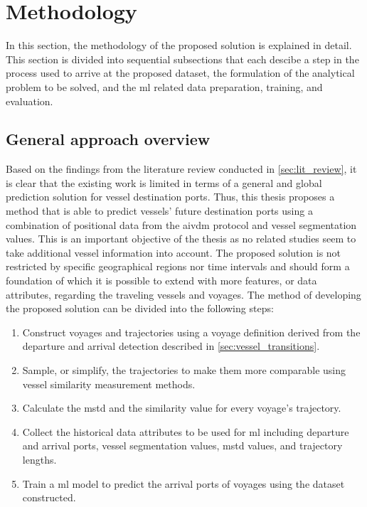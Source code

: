 \chapter{Methodology}
\label{chap:method}

In this section, the methodology of the proposed solution is explained in detail. This section is divided into sequential subsections that each descibe a step in the process used to arrive at the proposed dataset, the formulation of the analytical problem to be solved, and the \acrfull{ml} related data preparation, training, and evaluation.

\section{General approach overview}

Based on the findings from the literature review conducted in \cref{sec:lit_review}, it is clear that the existing work is limited in terms of a general and global prediction solution for vessel destination ports. Thus, this thesis proposes a method that is able to predict vessels' future destination ports using a combination of positional data from the \gls{aivdm} protocol and vessel segmentation values. This is an important objective of the thesis as no related studies seem to take additional vessel information into account. The proposed solution is not restricted by specific geographical regions nor time intervals and should form a foundation of which it is possible to extend with more features, or data attributes, regarding the traveling vessels and voyages. The method of developing the proposed solution can be divided into the following steps:

\begin{enumerate}
    \item Construct voyages and trajectories using a voyage definition derived from the departure and arrival detection described in \cref{sec:vessel_transitions}.
    \item Sample, or simplify, the trajectories to make them more comparable using vessel similarity measurement methods.
    \item Calculate the \acrfull{mstd} and the similarity value for every voyage's trajectory.
    \item Collect the historical data attributes to be used for \acrfull{ml} including departure and arrival ports, vessel segmentation values, \acrshort{mstd} values, and trajectory lengths.
    \item Train a \acrshort{ml} model to predict the arrival ports of voyages using the dataset constructed.
\end{enumerate}

